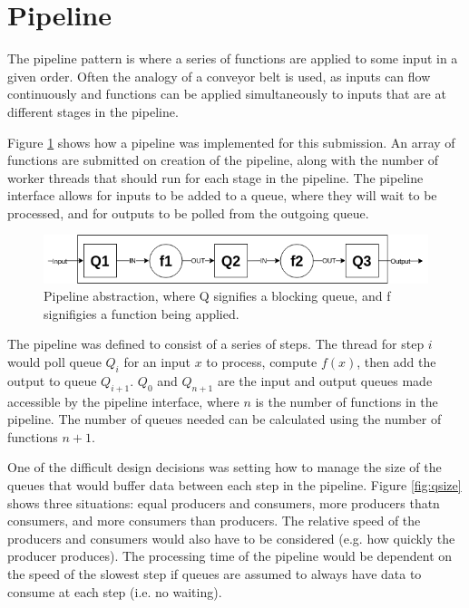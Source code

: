 \documentclass[12pt]{article}
\begin{document}
\section{Pipeline} 

The pipeline pattern is where a series of functions are applied to some input in a given order. Often the analogy of a conveyor belt is used, as inputs can flow continuously and functions can be applied simultaneously to inputs that are at different stages in the pipeline.

Figure \ref{fig:pipe} shows how a pipeline was implemented for this submission. An array of functions are submitted on creation of the pipeline, along with the number of worker threads that should run for each stage in the pipeline. The pipeline interface allows for inputs to be added to a queue, where they will wait to be processed, and for outputs to be polled from the outgoing queue. 

\begin{figure}[!ht]
	\centering 
	\includegraphics[width=\linewidth]{images/pipe}
	\caption{Pipeline abstraction, where Q signifies a blocking queue, and f signifigies a function being applied.}
	\label{fig:pipe}
\end{figure}

The pipeline was defined to consist of a series of steps. The thread for step $i$ would poll queue $Q_i$ for an input $x$ to process, compute $f(x)$, then add the output to queue $Q_{i+1}$. $Q_0$ and $Q_{n+1}$ are the input and output queues made accessible by the pipeline interface, where $n$ is the number of functions in the pipeline. The number of queues needed can be calculated using the number of functions $n+1$. 

One of the difficult design decisions was setting how to manage the size of the queues that would buffer data between each step in the pipeline. Figure \ref{fig:qsize} shows three situations: equal producers and consumers, more producers thatn consumers, and more consumers than producers. The relative speed of the producers and consumers would also have to be considered (e.g. how quickly the producer produces). The processing time of the pipeline would be dependent on the speed of the slowest step if queues are assumed to always have data to consume at each step (i.e. no waiting).
\end{document}
